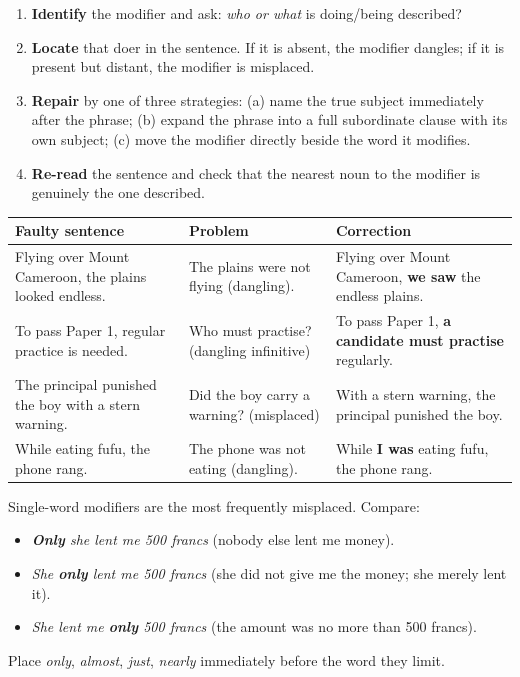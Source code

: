 \documentclass[11pt]{article}
\begin{document}
\begin{methode}
\begin{enumerate}
\item \textbf{Identify} the modifier and ask: \emph{who or what} is doing/being described?
\item \textbf{Locate} that doer in the sentence. If it is absent, the modifier dangles; if it is present but distant, the modifier is misplaced.
\item \textbf{Repair} by one of three strategies: (a) name the true subject immediately after the phrase; (b) expand the phrase into a full subordinate clause with its own subject; (c) move the modifier directly beside the word it modifies.
\item \textbf{Re-read} the sentence and check that the nearest noun to the modifier is genuinely the one described.
\end{enumerate}
\end{methode}

\begin{exemplebox}
\begin{center}
\begin{tabularx}{\linewidth}{|l|X|X|}
\hline
\rowcolor{popblueL} \textbf{Faulty sentence} & \textbf{Problem} & \textbf{Correction} \\
\hline
Flying over Mount Cameroon, the plains looked endless. & The plains were not flying (dangling). & Flying over Mount Cameroon, \textbf{we saw} the endless plains. \\
\hline
To pass Paper 1, regular practice is needed. & Who must practise? (dangling infinitive) & To pass Paper 1, \textbf{a candidate must practise} regularly. \\
\hline
The principal punished the boy with a stern warning. & Did the boy carry a warning? (misplaced) & With a stern warning, the principal punished the boy. \\
\hline
While eating fufu, the phone rang. & The phone was not eating (dangling). & While \textbf{I was} eating fufu, the phone rang. \\
\hline
\end{tabularx}
\end{center}
\end{exemplebox}

\begin{attention}
Single-word modifiers are the most frequently misplaced. Compare:
\begin{itemize}
\item \emph{\textbf{Only} she lent me 500 francs} (nobody else lent me money).
\item \emph{She \textbf{only} lent me 500 francs} (she did not give me the money; she merely lent it).
\item \emph{She lent me \textbf{only} 500 francs} (the amount was no more than 500 francs).
\end{itemize}
Place \emph{only}, \emph{almost}, \emph{just}, \emph{nearly} immediately before the word they limit.
\end{attention}
\end{document}
